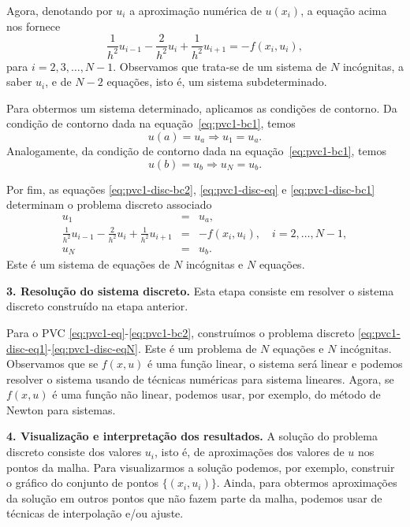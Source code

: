 Agora, denotando por $u_i$ a aproximação numérica de $u(x_i)$, a equação acima nos fornece
\begin{equation}\label{eq:pvc1-disc-eq}
\frac{1}{h^2}u_{i-1} - \frac{2}{h^2}u_i + \frac{1}{h^2}u_{i+1} = -f(x_i, u_i),
\end{equation}
para $i=2, 3, \dotsc, N-1$. Observamos que trata-se de um sistema de $N$ incógnitas, a saber $u_i$, e de $N-2$ equações, isto é, um sistema subdeterminado.

Para obtermos um sistema determinado, aplicamos as condições de contorno. Da condição de contorno dada na equação~\eqref{eq:pvc1-bc1}, temos
\begin{equation}\label{eq:pvc1-disc-bc1}
  u(a) = u_a\Rightarrow u_1 = u_a.
\end{equation}
Analogamente, da condição de contorno dada na equação~\eqref{eq:pvc1-bc1}, temos
\begin{equation}\label{eq:pvc1-disc-bc2}
  u(b) = u_b\Rightarrow u_N = u_b.
\end{equation}

Por fim, as equações \eqref{eq:pvc1-disc-bc2}, \eqref{eq:pvc1-disc-eq} e \eqref{eq:pvc1-disc-bc1} determinam o problema discreto associado
\begin{eqnarray}
  u_1 &=& u_a,\label{eq:pvc1-disc-eq1}\\
  \frac{1}{h^2}u_{i-1} - \frac{2}{h^2}u_i + \frac{1}{h^2}u_{i+1} &=& -f(x_i, u_i),\quad i=2, \dotsc, N-1,\label{eq:pvc1-disc-eqi}\\
  u_N &=& u_b.\label{eq:pvc1-disc-eqN}
\end{eqnarray}
Este é um sistema de equações de $N$ incógnitas e $N$ equações.

{\bf 3. Resolução do sistema discreto.} Esta etapa consiste em resolver o sistema discreto construído na etapa anterior. 

Para o PVC \eqref{eq:pvc1-eq}-\eqref{eq:pvc1-bc2}, construímos o problema discreto \eqref{eq:pvc1-disc-eq1}-\eqref{eq:pvc1-disc-eqN}. Este é um problema de $N$ equações e $N$ incógnitas. Observamos que se $f(x, u)$ é uma função linear, o sistema será linear e podemos resolver o sistema usando de técnicas numéricas para sistema lineares. Agora, se $f(x, u)$ é uma função não linear, podemos usar, por exemplo, do método de Newton para sistemas.

{\bf 4. Visualização e interpretação dos resultados.} A solução do problema discreto consiste dos valores $u_i$, isto é, de aproximações dos valores de $u$ nos pontos da malha. Para visualizarmos a solução podemos, por exemplo, construir o gráfico do conjunto de pontos $\{(x_i, u_i)\}$. Ainda, para obtermos aproximações da solução em outros pontos que não fazem parte da malha, podemos usar de técnicas de interpolação e/ou ajuste.

